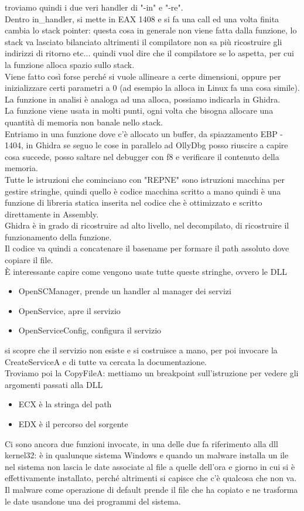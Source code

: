 \documentclass[12pt, oneside]{extbook}
\begin{document}
troviamo quindi i due veri handler di "-in" e "-re".\\Dentro in\_handler, si mette in EAX 1408 e si fa una call ed una volta finita cambia lo stack pointer: questa cosa in generale non viene fatta dalla funzione, lo stack va lasciato bilanciato altrimenti il compilatore non sa più ricostruire gli indirizzi di ritorno etc... quindi vuol dire che il compilatore se lo aspetta, per cui la funzione alloca spazio sullo stack.\\Viene fatto così forse perché si vuole allineare a certe dimensioni, oppure per inizializzare certi parametri a 0 (ad esempio la \textsf{alloca} in Linux fa una cosa simile).\\La funzione in analisi è analoga ad una \textsf{alloca}, possiamo indicarla in Ghidra.\\La funzione viene usata in molti punti, ogni volta che bisogna allocare una quantità di memoria non banale nello stack.\\Entriamo in una funzione dove c'è allocato un buffer, da spiazzamento EBP - 1404, in Ghidra se seguo le cose in parallelo ad OllyDbg posso riuscire a capire cosa succede, posso saltare nel debugger con f8 e verificare il contenuto della memoria.\\Tutte le istruzioni che cominciano con "REPNE" sono istruzioni macchina per gestire stringhe, quindi quello è codice macchina scritto a mano quindi è una funzione di libreria statica inserita nel codice che è ottimizzato e scritto direttamente in Assembly.\\Ghidra è in grado di ricostruire ad alto livello, nel decompilato, di ricostruire il funzionamento della funzione.\\Il codice va quindi a concatenare il basename per formare il path assoluto dove copiare il file.\\È interessante capire come vengono usate tutte queste stringhe, ovvero le DLL
\begin{itemize}
\item OpenSCManager, prende un handler al manager dei servizi
\item OpenService, apre il servizio
\item OpenServiceConfig, configura il servizio
\end{itemize}
si scopre che il servizio non esiste e si costruisce a mano, per poi invocare la CreateServiceA e di tutte va cercata la documentazione.\\Troviamo poi la CopyFileA: mettiamo un breakpoint sull'istruzione per vedere gli argomenti passati alla DLL
\begin{itemize}
\item ECX è la stringa del path
\item EDX è il percorso del sorgente
\end{itemize}
Ci sono ancora due funzioni invocate, in una delle due fa riferimento alla dll kernel32: è in qualunque sistema Windows e quando un malware installa un ile nel sistema non lascia le date associate al file a quelle dell'ora e giorno in cui si è effettivamente installato, perché altrimenti si capisce che c'è qualcosa che non va. Il malware come operazione di default prende il file che ha copiato e ne trasforma le date usandone una dei programmi del sistema.
\end{document}

